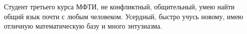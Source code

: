 


\begin{cvparagraph}

Студент третьего курса МФТИ, не конфликтный, общительный, умею найти общий язык почти с любым человеком.
Усердный, быстро учусь новому, имею отличную математическую базу и много энтузиазма.
\end{cvparagraph}
